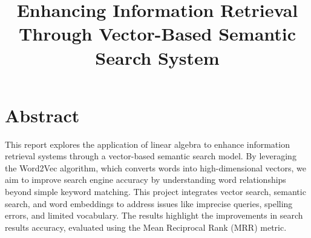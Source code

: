 \documentclass{article}
\title{Enhancing Information Retrieval Through Vector-Based Semantic Search System}
\author{}
\date{}
\begin{document}
\maketitle
\vspace{-3.3cm}

\section{Abstract}
This report explores the application of linear algebra to enhance information retrieval systems through a vector-based semantic search model. By leveraging the Word2Vec algorithm, which converts words into high-dimensional vectors, we aim to improve search engine accuracy by understanding word relationships beyond simple keyword matching. This project integrates vector search, semantic search, and word embeddings to address issues like imprecise queries, spelling errors, and limited vocabulary. The results highlight the improvements in search results accuracy, evaluated using the Mean Reciprocal Rank (MRR) metric.













\newpage

\end{document}
